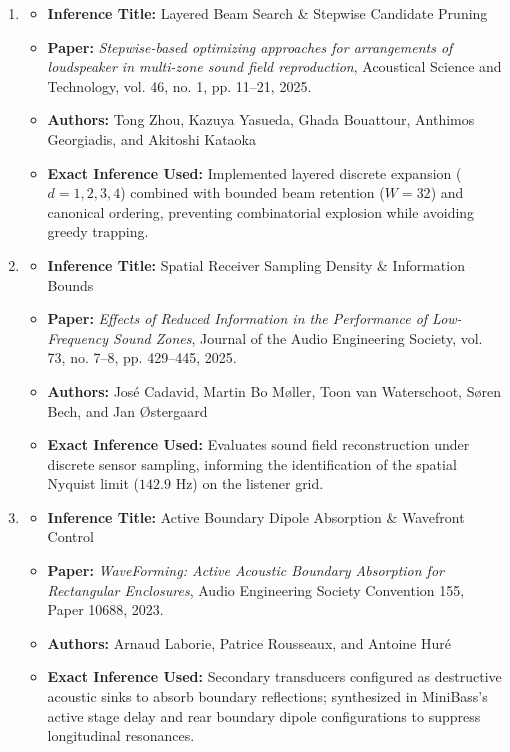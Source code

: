 \documentclass[11pt,a4paper]{article}
\begin{document}
\begin{enumerate}
    \item 
    \begin{itemize}
        \item \textbf{Inference Title:} Layered Beam Search \& Stepwise Candidate Pruning
        \item \textbf{Paper:} \textit{Stepwise-based optimizing approaches for arrangements of loudspeaker in multi-zone sound field reproduction}, Acoustical Science and Technology, vol. 46, no. 1, pp. 11--21, 2025.
        \item \textbf{Authors:} Tong Zhou, Kazuya Yasueda, Ghada Bouattour, Anthimos Georgiadis, and Akitoshi Kataoka
        \item \textbf{Exact Inference Used:} Implemented layered discrete expansion ($d = 1, 2, 3, 4$) combined with bounded beam retention ($W=32$) and canonical ordering, preventing combinatorial explosion while avoiding greedy trapping.
    \end{itemize}

    \item 
    \begin{itemize}
        \item \textbf{Inference Title:} Spatial Receiver Sampling Density \& Information Bounds
        \item \textbf{Paper:} \textit{Effects of Reduced Information in the Performance of Low-Frequency Sound Zones}, Journal of the Audio Engineering Society, vol. 73, no. 7--8, pp. 429--445, 2025.
        \item \textbf{Authors:} Jos{\'e} Cadavid, Martin Bo M{\o}ller, Toon van Waterschoot, S{\o}ren Bech, and Jan {\O}stergaard
        \item \textbf{Exact Inference Used:} Evaluates sound field reconstruction under discrete sensor sampling, informing the identification of the spatial Nyquist limit ($142.9\text{ Hz}$) on the listener grid.
    \end{itemize}

    \item 
    \begin{itemize}
        \item \textbf{Inference Title:} Active Boundary Dipole Absorption \& Wavefront Control
        \item \textbf{Paper:} \textit{WaveForming: Active Acoustic Boundary Absorption for Rectangular Enclosures}, Audio Engineering Society Convention 155, Paper 10688, 2023.
        \item \textbf{Authors:} Arnaud Laborie, Patrice Rousseaux, and Antoine Hur{\'e}
        \item \textbf{Exact Inference Used:} Secondary transducers configured as destructive acoustic sinks to absorb boundary reflections; synthesized in MiniBass's active stage delay and rear boundary dipole configurations to suppress longitudinal resonances.
    \end{itemize}


\end{enumerate}
\end{document}

